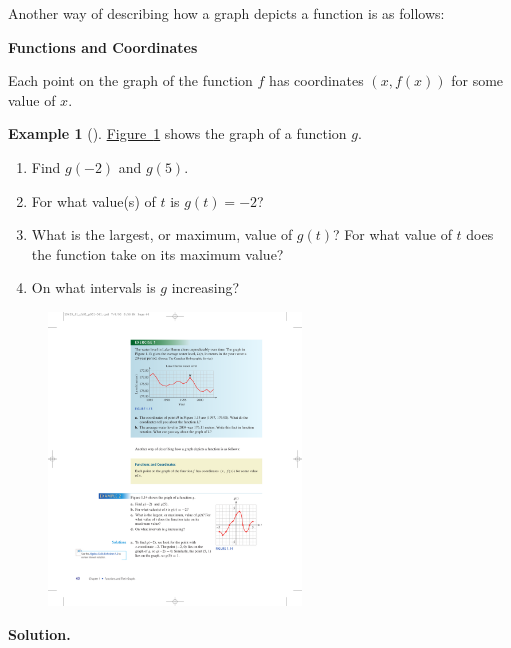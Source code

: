 \documentclass[10pt,]{book}
\theoremstyle{plain}
\theoremstyle{definition}
\theoremstyle{definition}
\newtheorem{example}[theorem]{Example}
\theoremstyle{definition}
\theoremstyle{definition}
\numberwithin{equation}{section}
\begin{document}
    Another way of describing how a graph depicts a function is as follows:
%
\begin{mdframed}[style=assemblage]%
\noindent\textbf{\large Functions and Coordinates}\label{assemblage-7}\par\medskip

    Each point on the graph of the function \(f\) has coordinates \((x, f (x))\) for some value of \(x\).
%
\end{mdframed}
\begin{example}[]\label{example-function-graph}
\hyperref[fig-function]{Figure~\ref{fig-function}} shows the graph of a function \(g\).
    \leavevmode%
\begin{enumerate}[label=*\alph**]
\item\hypertarget{li-123}{}Find \(g(−2)\) and \(g(5)\).\item\hypertarget{li-124}{}For what value(s) of \(t\) is \(g(t) = −2\)?\item\hypertarget{li-125}{}What is the largest, or maximum, value of \(g(t)\)? For what value of \(t\) does the function take on its maximum value?\item\hypertarget{li-126}{}On what intervals is \(g\) increasing?\end{enumerate}
%
\leavevmode%
\begin{figure}
\centering
\includegraphics[width=0.60\textwidth,]{images/fig-function.pdf}\caption{\label{fig-function}}
\end{figure}
\par\medskip\noindent%
\textbf{Solution.}\quad \leavevmode%
\begin{enumerate}[label=*\alph**]

\end{enumerate}
\end{example}
\end{document}
